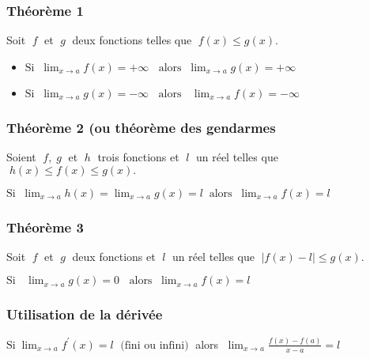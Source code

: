 \subsubsection*{Théorème 1}
     \begin{theorem}
           Soit $\;f \;$ et $\;g \;$  deux fonctions telles que $\;   f(x)\leq g(x) $.
        \begin{itemize}           
         \item  $  \text{Si}\; \; \lim_{x \to a}{f(x)} =+\infty \;\; \text{ alors} \;\; \lim_{x \to a}{g(x)} =+\infty$
          
          
        \item   $ \text{Si}\;\;  \lim_{x \to a}{g(x)} =-\infty \;\; \text{ alors }\;\; \lim_{x \to a}{f(x)} =-\infty$
          \end{itemize}
       \end{theorem}
     
      \subsubsection*{Théorème 2 (ou théorème  des gendarmes}
          \begin{theorem}
            Soient  $\; f  , \; g  \; $  et  $ \; h \;$  trois fonctions et  $\;l \;$ un réel telles que  $ \; h(x)\leq f(x) \leq g(x).$
            
           $ \text{Si}\;  \; \lim_{x \to a}{h(x)} =\lim_{x \to a}{g(x)}=l  \;\; \text{alors} \;\; \lim_{x \to a}{f(x)} =l$ 
       \end{theorem}
     \subsubsection*{Théorème 3}
      \begin{theorem} Soit $\;  f \; $ et $\; g \;$  deux fonctions et $\; l  \; $  un réel telles que $\;\left|f(x)-l\right| \leq g(x).$
      
     $ \text{Si }\; \;\lim_{x \to a}{g(x)} =0 \;\; \text{ alors}\; \; \lim_{x \to a}{f(x)} =l$
     \end{theorem}
      \subsubsection*{Utilisation de la dérivée}
     \begin{theorem}
           $ \text{Si} \;\lim_{x \to a}{f^{\prime}(x)} =l\; \text{ (fini ou infini)}\;$   alors $  \; \lim_{x \to a}{\frac{f(x)-f(a)}{x-a}} =l$
            \end{theorem}

